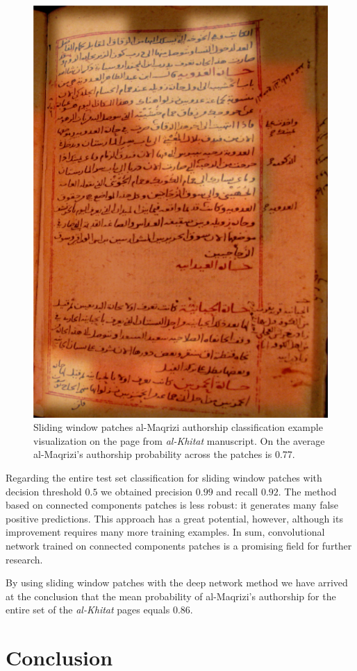 \documentclass[a4paper,conference]{IEEEtran}
\begin{document}
\begin{figure}[!t]
	\centering
  \includegraphics[width=0.49\linewidth]{figures/hitat_15_fixed.png}
   \caption{Sliding window patches al-Maqrizi authorship classification example visualization on the page from {\it al-Khitat} manuscript. On the average al-Maqrizi's authorship probability across the patches is 0.77.}
	\label{fig:al_maqrizi_classification_example_test_hitat}
\end{figure}

Regarding the entire test set classification for sliding window patches with decision threshold $0.5$ we obtained precision $0.99$ and recall $0.92$. The method based on connected components patches is less robust: it generates many false positive predictions. This approach has a great potential, however, although its improvement requires many more training examples. In sum, convolutional network trained on connected components patches is a promising field for further research.

By using sliding window patches with the deep network method we have arrived at the conclusion that the mean probability of al-Maqrizi's authorship for the entire set of the {\it al-Khitat} pages equals $0.86$.    

\section{Conclusion}
\end{document}
